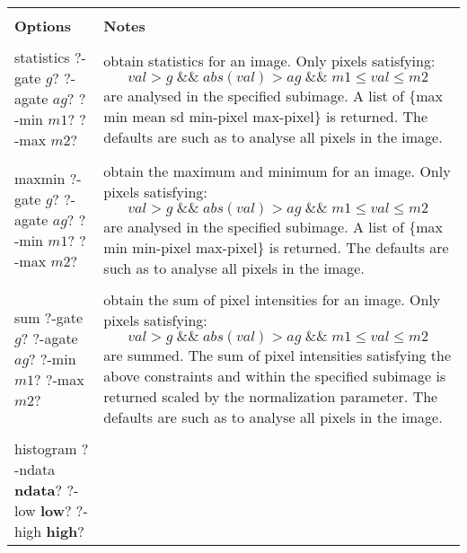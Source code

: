 \begin{table}
\begin{tabular}{|l||l|}
\hline
& \\
{\bf Options} & {\bf Notes} \\
& \\ \hline
\begin{minipage}[t]{4.0cm}
\flushleft 
statistics 
?-gate $g$? ?-agate $ag$?
?-min $m1$? ?-max $m2$?
\end{minipage} &
\begin{minipage}[t]{11.0cm}
obtain statistics for an image. Only pixels satisfying:
\[
val > g  \; \&\&  \; abs( val ) > ag \; \&\&  \; m1 \le val \le m2
\]
are analysed in the specified subimage.  
A list of \{max min mean sd min-pixel max-pixel\}
is returned.  The defaults are such as to analyse all pixels in the
image.
\end{minipage} \\
& \\ 
\begin{minipage}[t]{4.0cm}
\flushleft 
maxmin 
?-gate $g$? ?-agate $ag$?
?-min $m1$? ?-max $m2$?
\end{minipage} &
\begin{minipage}[t]{11.0cm}
obtain the maximum and minimum for an image. Only pixels satisfying:
\[
val > g  \; \&\&  \; abs( val ) > ag \; \&\&  \; m1 \le val \le m2
\]
are analysed in the specified subimage.  
A list of \{max min min-pixel max-pixel\}
is returned.  The defaults are such as to analyse all pixels in the
image.
\end{minipage} \\
& \\ 
\begin{minipage}[t]{4.0cm}
\flushleft 
sum 
?-gate $g$? ?-agate $ag$?
?-min $m1$? ?-max $m2$?
\end{minipage} &
\begin{minipage}[t]{11.0cm}
obtain the sum of pixel intensities for an image. Only pixels satisfying:
\[
val > g  \; \&\&  \; abs( val ) > ag \; \&\&  \; m1 \le val \le m2
\]
are summed.  The sum of pixel intensities satisfying the above
constraints and within the specified subimage is returned scaled by the
normalization parameter.  
The defaults are such as to analyse all pixels in the image.
\end{minipage} \\
& \\ 
\begin{minipage}[t]{4.0cm}
\flushleft 
histogram ?-ndata {\bf ndata}? 
?-low {\bf low}? ?-high {\bf high}?

\end{minipage}
\end{tabular}
\end{table}
